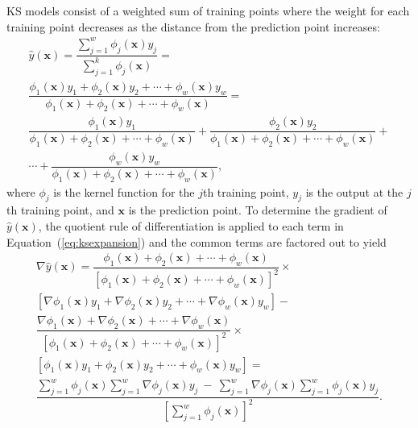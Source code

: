 \ac{KS} models consist of a weighted sum of training points where the weight for each training point decreases as the distance from the prediction point increases:
\begin{multline}
 \label{eq:ksexpansion}
	\hat{y}(\mathbf{x}) = \dfrac{\sum_{j=1}^{w} \phi_j(\mathbf{x})y_j}{\sum_{j=1}^{k} \phi_j(\mathbf{x})} = \\
	\dfrac{\phi_1(\mathbf{x}) y_1 + \phi_2(\mathbf{x}) y_2 +\cdots + \phi_w(\mathbf{x}) y_w}{\phi_1(\mathbf{x})+ \phi_2(\mathbf{x})+\cdots + \phi_w(\mathbf{x})} = \\
	\dfrac{\phi_1(\mathbf{x}) y_1}{\phi_1(\mathbf{x})+ \phi_2(\mathbf{x}) + \cdots + \phi_w(\mathbf{x})} + \dfrac{\phi_2(\mathbf{x}) y_2}{\phi_1(\mathbf{x})+ \phi_2(\mathbf{x})+\cdots + \phi_w(\mathbf{x})} + \\
	 \cdots + \dfrac{\phi_w(\mathbf{x}) y_w}{\phi_1(\mathbf{x})+ \phi_2(\mathbf{x})+\cdots + \phi_w(\mathbf{x})},
\end{multline}
where $\phi_j$ is the kernel function for the $j$th training point, $y_j$ is the output at the $j$th training point, and $\mathbf{x}$ is the prediction point. 
%
To determine the gradient of $\hat{y}(\mathbf{x})$, the quotient rule of differentiation is applied to each term in Equation~(\ref{eq:ksexpansion}) and the common terms are factored out to yield
\begin{multline}
\label{eq:jacobiancomponent}
\nabla\hat{y}(\mathbf{x}) = \dfrac{\phi_1(\mathbf{x})+ \phi_2(\mathbf{x})+\cdots + \phi_w(\mathbf{x})}{\left[\phi_1(\mathbf{x})+ \phi_2(\mathbf{x})+\cdots + \phi_w(\mathbf{x})\right]^2} \times \\
\left[\nabla\phi_1(\mathbf{x}) y_1 + \nabla\phi_2(\mathbf{x}) y_2 +\cdots + \nabla\phi_w(\mathbf{x}) y_w\right] - \\
\dfrac{\nabla\phi_1(\mathbf{x})+ \nabla\phi_2(\mathbf{x})+ \cdots + \nabla\phi_w(\mathbf{x})}{\left[\phi_1(\mathbf{x})+ \phi_2(\mathbf{x})+\cdots + \phi_w(\mathbf{x})\right]^2} \times \\
\left[\phi_1(\mathbf{x}) y_1 + \phi_2(\mathbf{x}) y_2 +\cdots + \phi_w(\mathbf{x}) y_w\right] =\\
	\dfrac{{\sum_{j=1}^{w} \phi_j(\mathbf{x})} {\sum_{j=1}^{w} \nabla\phi_j(\mathbf{x})y_j}~-~{{\sum_{j=1}^{w} \nabla\phi_j(\mathbf{x})}{\sum_{j=1}^{w} \phi_j(\mathbf{x})y_j}}}{\left[\sum_{j=1}^{w} \phi_j(\mathbf{x})\right]^2}.
\end{multline}

